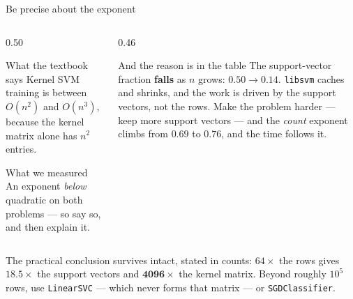 \documentclass[aspectratio=169]{beamer}
\begin{document}
\begin{frame}[shrink=6]{Be precise about the exponent}
  \begin{columns}[T]
    \begin{column}{0.50\textwidth}
      \begin{alertblock}{What the textbook says}
        Kernel SVM training is between $O(n^2)$ and $O(n^3)$, because the
        kernel matrix alone has $n^2$ entries.
      \end{alertblock}
      \begin{block}{What we measured}
        An exponent \emph{below} quadratic on both problems --- so say so,
        and then explain it.
      \end{block}
    \end{column}
    \begin{column}{0.46\textwidth}
      \begin{exampleblock}{And the reason is in the table}
        The support-vector fraction \textbf{falls} as $n$ grows:
        $0.50 \to 0.14$. \texttt{libsvm} caches and shrinks, and the work is
        driven by the support vectors, not the rows. Make the problem harder
        --- keep more support vectors --- and the \emph{count} exponent
        climbs from $0.69$ to $0.76$, and the time follows it.
      \end{exampleblock}
    \end{column}
  \end{columns}
  \begin{center}\small
    The practical conclusion survives intact, stated in counts: $64\times$
    the rows gives $\mathbf{18.5\times}$ the support vectors and
    $\mathbf{4096\times}$ the kernel matrix. Beyond roughly $10^5$ rows, use
    \texttt{LinearSVC} --- which never forms that matrix --- or
    \texttt{SGDClassifier}.
  \end{center}
\end{frame}
\end{document}
